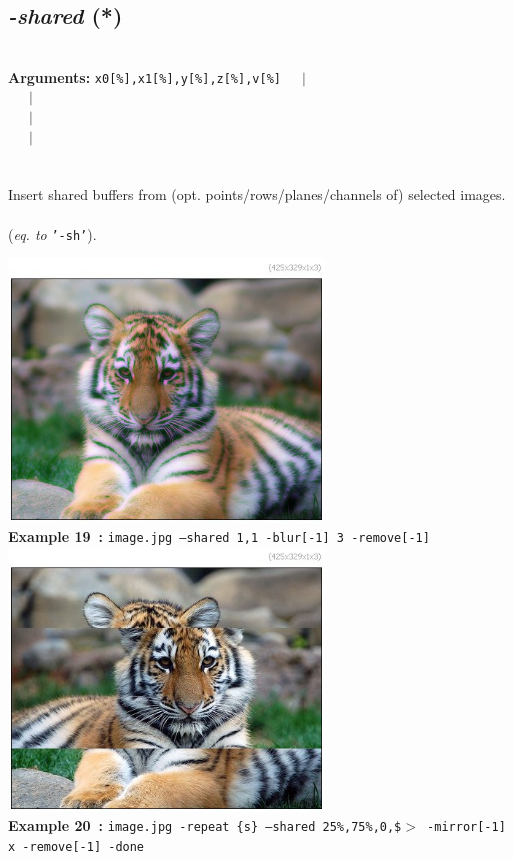 \documentclass[a4paper,11pt,twoside]{book}
\begin{document}
\subsection{\emph{-shared} (*)}\vspace*{-0.5em}
~\\\textbf{Arguments: } 
{\small \texttt{x0[\%],x1[\%],y[\%],z[\%],v[\%]}}~~~$|$\\
~~~$|$\\
~~~$|$\\
~~~$|$\\
\\~\\
Insert shared buffers from (opt. points/rows/planes/channels of) selected images.
~\\(\emph{eq. to} {\small \texttt{'-sh'}}).
\begin{center}\includegraphics[keepaspectratio=true,height=7cm,width=\textwidth]{img/gmic_def19.jpg}\\
{\footnotesize \textbf{Example 19~:} \texttt{image.jpg --shared 1,1 -blur[-1] 3 -remove[-1]}}
\\\includegraphics[keepaspectratio=true,height=7cm,width=\textwidth]{img/gmic_def20.jpg}\\
{\footnotesize \textbf{Example 20~:} \texttt{image.jpg -repeat \{s\} --shared 25\%,75\%,0,\$$>$ -mirror[-1] x -remove[-1] -done}}
\end{center}
\end{document}
